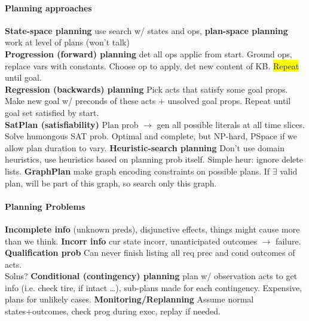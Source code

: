 \paragraph{Planning approaches}
\textbf{State-space planning} use search w/ states and ops,
\textbf{plan-space planning} work at level of plans (won't talk)
\\ \textbf{Progression (forward) planning} det all ops applic from
start. Ground ops, replace vars with constants. Choose op to apply,
det new content of KB. \colorbox{yellow}{Repeat} until goal.
\\ \textbf{Regression (backwards) planning} Pick acts that satisfy
some goal props. Make new goal w/ preconds of these acts + unsolved
goal props. Repeat until goal set satisfied by start.
\\ \textbf{SatPlan (satisfiability)} Plan prob $\to$ gen all possible literals at all
time slices. Solve humongous SAT prob. Optimal and complete, but
NP-hard, PSpace if we allow plan duration to
vary. \textbf{Heuristic-search planning} Don't use domain heuristics,
use heuristics based on planning prob itself. Simple heur: ignore
delete lists. \textbf{GraphPlan} make graph encoding constraints on
possible plans. If $\exists$ valid plan, will be part of this graph,
so search only this graph.
\paragraph{Planning Problems} \textbf{Incomplete info} (unknown preds),
disjunctive effects, things might cause more than we
think. \textbf{Incorr info} cur state incorr, unanticipated outcomes
$\to$ failure. \textbf{Qualification prob} Can never finish listing
all req prec and cond outcomes of acts.
\\ Solns? \textbf{Conditional (contingency) planning} plan w/
observation acts to get info (i.e. check tire, if intact \ldots),
sub-plans made for each contingency. Expensive, plans for unlikely
cases. \textbf{Monitoring/Replanning} Assume normal states+outcomes,
check prog during exec, replay if needed.
\color{black}
